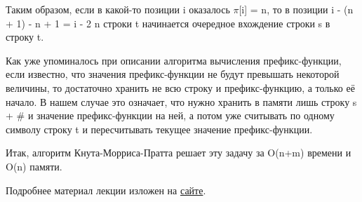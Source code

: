 \begin{lecture}[\lectureSubject]
\begin{lecSection}
		Таким образом, если в какой-то позиции i оказалось $\pi$[i] = n, то в позиции i - (n + 1) - n + 1 = i - 2 n строки t начинается очередное вхождение строки s в строку t.
		
		Как уже упоминалось при описании алгоритма вычисления префикс-функции, если известно, что значения префикс-функции не будут превышать некоторой величины, то достаточно хранить не всю строку и префикс-функцию, а только её начало. В нашем случае это означает, что нужно хранить в памяти лишь строку s + \# и значение префикс-функции на ней, а потом уже считывать по одному символу строку t и пересчитывать текущее значение префикс-функции.
		
		Итак, алгоритм Кнута-Морриса-Пратта решает эту задачу за O(n+m) времени и O(n) памяти.
		
		Подробнее материал лекции изложен на \href{http://e-maxx.ru/algo/prefix_function}{сайте}.
	\end{lecSection}
\end{lecture}
